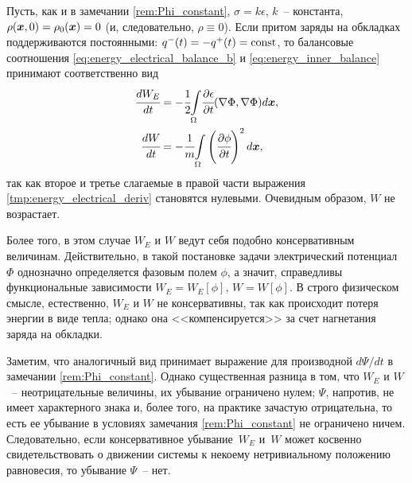 \begin{remark}
\label{rem:charge_constant}
Пусть, как и в замечании \ref{rem:Phi_constant}, $\sigma = k\epsilon$, $k$~-- константа, $\rho({\boldsymbol{x}}, 0) = \rho_0({\boldsymbol{x}}) = 0$ (и, следовательно, $\rho \equiv 0$). Если притом заряды на обкладках поддерживаются постоянными: $q^-(t) = -q^+(t) = \operatorname{{const}}$, то балансовые соотношения \eqref{eq:energy_electrical_balance_b} и \eqref{eq:energy_inner_balance} принимают соответственно вид
\begin{align*}
    \cfrac{d W_E}{dt} & = -\cfrac{1}{2} {\int\limits_\Omega} \cfrac{\partial \epsilon}{\partial t} (\nabla \Phi, \nabla \Phi) d {\boldsymbol{x}}, \\
    \cfrac{dW}{dt} & = -\cfrac{1}{m} {\int\limits_\Omega} \left( \cfrac{\partial \phi}{\partial t} \right)^2 d {\boldsymbol{x}},
\end{align*}
так как второе и третье слагаемые в правой части выражения \eqref{tmp:energy_electrical_deriv} становятся нулевыми. Очевидным образом, $W$ не возрастает.

Более того, в этом случае $W_E$ и $W$ ведут себя подобно консервативным величинам. Действительно, в такой постановке задачи электрический потенциал $\Phi$ однозначно определяется фазовым полем $\phi$, а значит, справедливы функциональные зависимости $W_E = W_E[\phi]$, $W = W[\phi]$. В строго физическом смысле, естественно, $W_E$ и $W$ не консервативны, так как происходит потеря энергии в виде тепла; однако она <<компенсируется>> за счет нагнетания заряда на обкладки.

Заметим, что аналогичный вид принимает выражение для производной $d \Psi / dt$ в замечании \ref{rem:Phi_constant}. Однако существенная разница в том, что $W_E$ и $W$~-- неотрицательные величины, их убывание ограничено нулем; $\Psi$, напротив, не имеет характерного знака и, более того, на практике зачастую отрицательна, то есть ее убывание в условиях замечания \ref{rem:Phi_constant} не ограничено ничем. Следовательно, если консервативное убывание~$W_E$ и~$W$ может косвенно свидетельствовать о движении системы к некоему нетривиальному положению равновесия, то убывание $\Psi$~-- нет.
\end{remark}